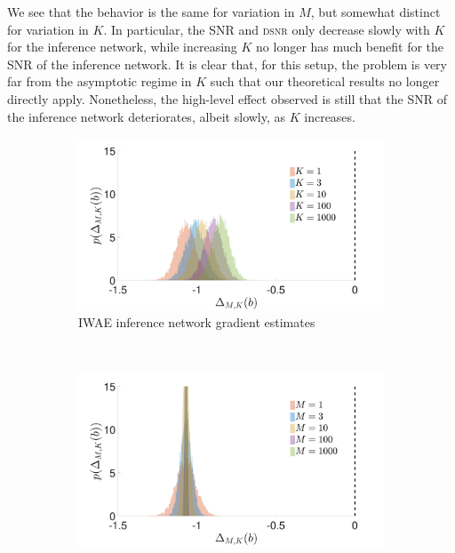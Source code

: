We see that the behavior is the
same for variation in $M$, but somewhat distinct for variation in $K$.  
In particular, the \gls{SNR} and \textsc{dsnr} only decrease slowly with $K$ for the inference network, while increasing $K$ no longer has much benefit for the \gls{SNR} of the
inference network.
It is clear that, for this
setup, the problem is very far from the asymptotic regime in $K$ such that our theoretical results no
longer directly apply.  Nonetheless, the high-level effect observed is still that the \gls{SNR} of 
the inference
network deteriorates, albeit slowly, as $K$ increases.

\begin{figure}[h]
	\centering
	\begin{subfigure}[b]{0.45\textwidth}
		\centering
		\includegraphics[width=\textwidth]{figures/tighter_bounds/hv_b_hist_IWAE}
		\caption{\gls{IWAE} inference network gradient estimates \label{fig:hv/b_hist_iwae}}
	\end{subfigure} ~~~~~~~~~~
	\begin{subfigure}[b]{0.45\textwidth}
		\centering
		\includegraphics[width=\textwidth]{figures/tighter_bounds/hv_b_hist_VAE}

\end{subfigure}
\end{figure}
